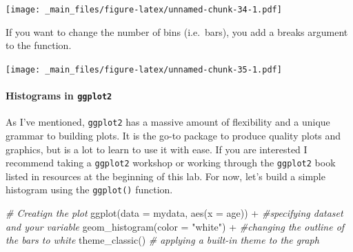 \documentclass[
]{book}
\newenvironment{Shaded}{\begin{snugshade}}{\end{snugshade}}
\newcommand{\AttributeTok}[1]{\textcolor[rgb]{0.77,0.63,0.00}{#1}}
\newcommand{\CommentTok}[1]{\textcolor[rgb]{0.56,0.35,0.01}{\textit{#1}}}
\newcommand{\DecValTok}[1]{\textcolor[rgb]{0.00,0.00,0.81}{#1}}
\newcommand{\FunctionTok}[1]{\textcolor[rgb]{0.00,0.00,0.00}{#1}}
\newcommand{\NormalTok}[1]{#1}
\newcommand{\SpecialCharTok}[1]{\textcolor[rgb]{0.00,0.00,0.00}{#1}}
\newcommand{\StringTok}[1]{\textcolor[rgb]{0.31,0.60,0.02}{#1}}
\begin{document}
\begin{Shaded}
\end{Shaded}

\texttt{[image: \_main\_files/figure-latex/unnamed-chunk-34-1.pdf]}

If you want to change the number of bins (i.e.~bars), you add a breaks argument to the function.

\begin{Shaded}
\end{Shaded}

\texttt{[image: \_main\_files/figure-latex/unnamed-chunk-35-1.pdf]}

\hypertarget{histgg}{%
\paragraph*{\texorpdfstring{Histograms in \texttt{ggplot2}}{Histograms in ggplot2}}\label{histgg}}

As I've mentioned, \texttt{ggplot2} has a massive amount of flexibility and a unique grammar to building plots. It is the go-to package to produce quality plots and graphics, but is a lot to learn to use it with ease. If you are interested I recommend taking a \texttt{ggplot2} workshop or working through the \texttt{ggplot2} book listed in resources at the beginning of this lab. For now, let's build a simple histogram using the \texttt{ggplot()} function.

\begin{Shaded}
\begin{Highlighting}[]
\CommentTok{\# Creatign the plot}
\FunctionTok{ggplot}\NormalTok{(}\AttributeTok{data =}\NormalTok{ mydata, }\FunctionTok{aes}\NormalTok{(}\AttributeTok{x =}\NormalTok{ age)) }\SpecialCharTok{+} \CommentTok{\#specifying dataset and your variable}
  \FunctionTok{geom\_histogram}\NormalTok{(}\AttributeTok{color =} \StringTok{"white"}\NormalTok{) }\SpecialCharTok{+} \CommentTok{\#changing the outline of the bars to white}
  \FunctionTok{theme\_classic}\NormalTok{() }\CommentTok{\# applying a built{-}in theme to the graph}
\end{Highlighting}
\end{Shaded}
\end{document}
